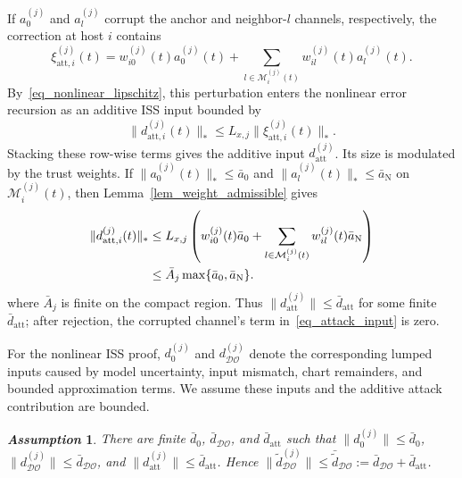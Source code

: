 \documentclass[letterpaper,journal]{IEEEtran}
\def\DO{\mathcal{DO}} %
\newtheorem{assumption}{\it Assumption}%
\begin{document}
If $a_0^{(j)}$ and $a_l^{(j)}$ corrupt the anchor and neighbor-$l$ channels, respectively, the correction at host $i$ contains
{\small
\begin{equation}
\xi_{\mathrm{att},i}^{(j)}(t)
=w_{i0}^{(j)}(t)a_{0}^{(j)}(t)
+\sum_{l\in\mathcal{M}_{i}^{(j)}(t)}w_{il}^{(j)}(t)a_{l}^{(j)}(t).
\label{eq_attack_input}
\end{equation}
}
By~\eqref{eq_nonlinear_lipschitz}, this perturbation enters the nonlinear error recursion as an additive ISS input bounded by
\begin{equation}
\|d_{\mathrm{att},i}^{(j)}(t)\|_*
\le L_{x,j}\|\xi_{\mathrm{att},i}^{(j)}(t)\|_* .
\label{eq_attack_lipschitz_bound}
\end{equation}
Stacking these row-wise terms gives the additive input $d_{\mathrm{att}}^{(j)}$. Its size is modulated by the trust weights.
If $\|a_{0}^{(j)}(t)\|_*\le \bar a_0$ and $\|a_{l}^{(j)}(t)\|_*\le \bar a_{\mathrm{N}}$ on $\mathcal{M}_{i}^{(j)}(t)$, then Lemma~\ref{lem_weight_admissible} gives
\begin{align}
\|d_{\mathrm{att},i}^{(j)}(t)\|_*
&\le L_{x,j}
\left(
w_{i0}^{(j)}(t)\bar a_0
+\sum_{l\in\mathcal{M}_{i}^{(j)}(t)}
w_{il}^{(j)}(t)\bar a_{\mathrm{N}}
\right) \notag\\
&\le \bar A_j \max\{\bar a_0,\bar a_{\mathrm{N}}\}.
\label{eq_attack_bound}
\end{align}
where $\bar A_j$ is finite on the compact region. Thus $\|d_{\mathrm{att}}^{(j)}\|\le\bar d_{\mathrm{att}}$ for some finite $\bar d_{\mathrm{att}}$; after rejection, the corrupted channel's term in~\eqref{eq_attack_input} is zero.

For the nonlinear ISS proof, $d_0^{(j)}$ and $d_{\DO}^{(j)}$ denote the corresponding lumped inputs caused by model uncertainty, input mismatch, chart remainders, and bounded approximation terms. We assume these inputs and the additive attack contribution are bounded.
\begin{assumption}\label{assum_distur}
There are finite $\bar d_0$, $\bar d_{\DO}$, and $\bar d_{\mathrm{att}}$ such that $\|d_0^{(j)}\|\le\bar d_0$, $\|d_{\DO}^{(j)}\|\le\bar d_{\DO}$, and $\|d_{\mathrm{att}}^{(j)}\|\le\bar d_{\mathrm{att}}$. Hence $\|\tilde d_{\DO}^{(j)}\|\le\bar{\tilde d}_{\DO}:=\bar d_{\DO}+\bar d_{\mathrm{att}}$.
\end{assumption}
\end{document}
